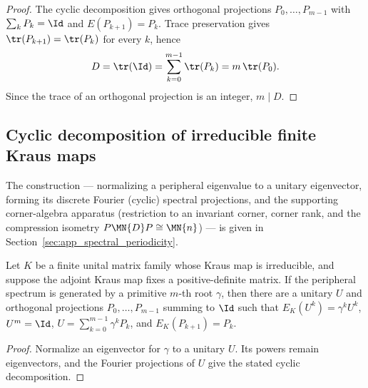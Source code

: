 \begin{proof}
    \leanok
    The cyclic decomposition gives orthogonal projections
    $P_0,\ldots,P_{m-1}$ with $\sum_kP_k=\Id$ and
    $E(P_{k+1})=P_k$. Trace preservation gives
    $\tr(P_{k+1})=\tr(P_k)$ for every $k$, hence
    \begin{align}
        D=\tr(\Id)=\sum_{k=0}^{m-1}\tr(P_k)=m\,\tr(P_0).
        \notag
    \end{align}
    Since the trace of an orthogonal projection is an integer, $m\mid D$.
\end{proof}

\subsection{Cyclic decomposition of irreducible finite Kraus maps}

The construction --- normalizing a peripheral eigenvalue to a unitary
eigenvector, forming its discrete Fourier (cyclic) spectral projections,
and the supporting corner-algebra apparatus (restriction to an invariant
corner, corner rank, and the compression isometry
$P\MN{D}P\cong\MN{n}$) --- is given in
Section~\ref{sec:app_spectral_periodicity}.

\begin{theorem}
    \label{thm:cyclic_decomposition_irreducible_schwarz}
    \leanok
    Let $K$ be a finite unital matrix family whose Kraus map is irreducible,
    and suppose the adjoint Kraus map fixes a positive-definite matrix. If the
    peripheral spectrum is generated by a primitive $m$-th root $\gamma$, then
    there are a unitary $U$ and orthogonal projections
    $P_0,\ldots,P_{m-1}$ summing to $\Id$ such that
    $E_K(U^k)=\gamma^kU^k$, $U^m=\Id$,
    $U=\sum_{k=0}^{m-1}\gamma^kP_k$, and $E_K(P_{k+1})=P_k$.
\end{theorem}

\begin{proof}
    \leanok
    Normalize an eigenvector for $\gamma$ to a unitary $U$. Its powers remain
    eigenvectors, and the Fourier projections of $U$ give the stated cyclic
    decomposition.
\end{proof}

